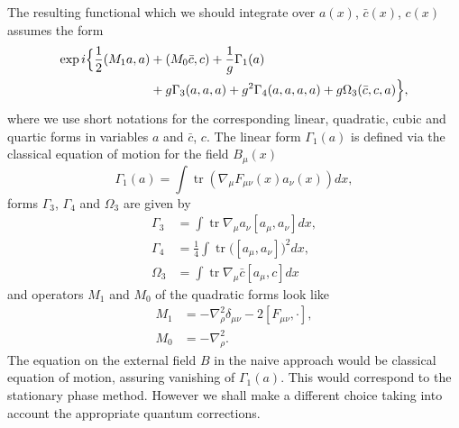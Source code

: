 \documentclass[12pt]{article}
\DeclareMathOperator{\tr}{tr}
\begin{document}
	The resulting functional which we should integrate over
    $ a(x) $, $ \bar{c}(x) $, $ c(x) $
	assumes the form
\begin{equation}
\begin{split}
    \exp i \Bigl\{ \frac{1}{2} (M_{1}a, a) & +(M_{0} \bar{c}, c)
	+ \frac{1}{g} \Gamma_{1}(a)  \\
	  &+ g \Gamma_{3}(a,a,a) + g^{2} \Gamma_{4}(a,a,a,a)
	    + g \Omega_{3} (\bar{c}, c, a) \Bigr\} ,
\end{split}
\end{equation}
	where we use short notations for the corresponding linear,
	quadratic, cubic and quartic forms in variables
    $ a $ and
    $ \bar{c} $, $ c $.
	The linear form
    $ \Gamma_{1}(a) $
	is defined via the classical equation of motion for
	the field
    $ B_{\mu}(x) $
\begin{equation}
\label{G1}
    \Gamma_{1}(a) = \int \tr (\nabla_{\mu} F_{\mu\nu}(x) a_{\nu}(x)) dx ,
\end{equation}
	forms 
    $ \Gamma_{3} $,
    $ \Gamma_{4} $
	and
    $ \Omega_{3} $
	are given by
\begin{align}
    \Gamma_{3} & = \int \tr \nabla_{\mu} a_{\nu} [a_{\mu}, a_{\nu}]
	dx ,\\
    \Gamma_{4} & = \frac{1}{4} \int \tr \bigl([a_{\mu}, a_{\nu}]
	\bigr)^{2} dx ,\\
\label{O3}
    \Omega_{3} & = \int \tr \nabla_{\mu} \bar{c} [a_{\mu}, c
] dx
\end{align}
	and operators 
    $ M_{1} $ and
    $ M_{0} $
	of the quadratic forms look like
\begin{align}
    M_{1} & = - \nabla_{\rho}^{2} \delta_{\mu\nu} - 2 [F_{\mu\nu}, \cdot] ,\\
    M_{0} & = - \nabla_{\rho}^{2} .
\end{align}
	The equation on the external field
    $ B $
	in the naive approach would be classical equation of motion,
	assuring vanishing of 
    $ \Gamma_{1}(a) $.
	This would correspond to the stationary phase method.
	However we shall make a different choice taking into account
	the appropriate quantum corrections.
\end{document}
